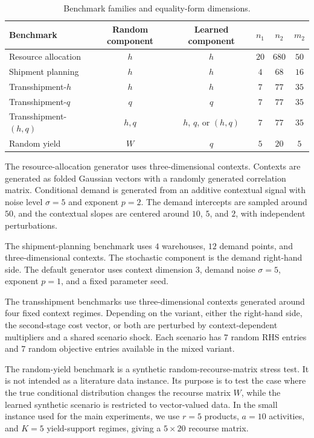 \begin{table}[h]
\centering
\small
\begin{tabular}{lccccc}
\toprule
Benchmark & Random component & Learned component & $n_1$ & $n_2$ & $m_2$ \\
\midrule
Resource allocation & $h$ & $h$ & $20$ & $680$ & $50$ \\
Shipment planning & $h$ & $h$ & $4$ & $68$ & $16$ \\
Transshipment-$h$ & $h$ & $h$ & $7$ & $77$ & $35$ \\
Transshipment-$q$ & $q$ & $q$ & $7$ & $77$ & $35$ \\
Transshipment-$(h,q)$ & $h,q$ & $h$, $q$, or $(h,q)$ & $7$ & $77$ & $35$ \\
Random yield & $W$ & $q$ & $5$ & $20$ & $5$ \\
\bottomrule
\end{tabular}
\caption{Benchmark families and equality-form dimensions.}
\label{tab:benchmark_dimensions}
\end{table}

The resource-allocation generator uses three-dimensional contexts. Contexts are generated as folded Gaussian vectors with a randomly generated correlation matrix. Conditional demand is generated from an additive contextual signal with noise level $\sigma=5$ and exponent $p=2$. The demand intercepts are sampled around $50$, and the contextual slopes are centered around $10$, $5$, and $2$, with independent perturbations.

The shipment-planning benchmark uses $4$ warehouses, $12$ demand points, and three-dimensional contexts. The stochastic component is the demand right-hand side. The default generator uses context dimension $3$, demand noise $\sigma=5$, exponent $p=1$, and a fixed parameter seed.

The transshipment benchmarks use three-dimensional contexts generated around four fixed context regimes. Depending on the variant, either the right-hand side, the second-stage cost vector, or both are perturbed by context-dependent multipliers and a shared scenario shock. Each scenario has $7$ random RHS entries and $7$ random objective entries available in the mixed variant.

The random-yield benchmark is a synthetic random-recourse-matrix stress test. It is not intended as a literature data instance. Its purpose is to test the case where the true conditional distribution changes the recourse matrix $W$, while the learned synthetic scenario is restricted to vector-valued data. In the small instance used for the main experiments, we use $r=5$ products, $a=10$ activities, and $K=5$ yield-support regimes, giving a $5\times 20$ recourse matrix.

